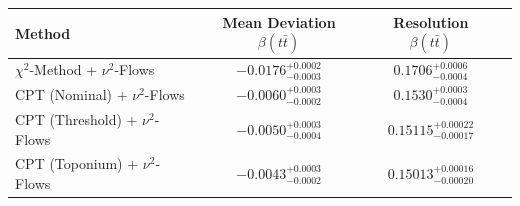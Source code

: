     \begin{tabular}{lccc}
        \toprule
        Method & Mean Deviation $\beta(t\bar{t})$ & Resolution $\beta(t\bar{t})$ \\
        \midrule
        $\chi^2$-Method + $\nu^2$-Flows & $-0.0176^{+0.0002}_{-0.0003}$ & $0.1706^{+0.0006}_{-0.0004}$ \\
        CPT (Nominal) + $\nu^2$-Flows & $-0.0060^{+0.0003}_{-0.0002}$ & $0.1530^{+0.0003}_{-0.0004}$ \\
        CPT (Threshold) + $\nu^2$-Flows & $-0.0050^{+0.0003}_{-0.0004}$ & $0.15115^{+0.00022}_{-0.00017}$ \\
        CPT (Toponium) + $\nu^2$-Flows & $-0.0043^{+0.0003}_{-0.0002}$ & $0.15013^{+0.00016}_{-0.00020}$ \\
        \bottomrule
    \end{tabular}